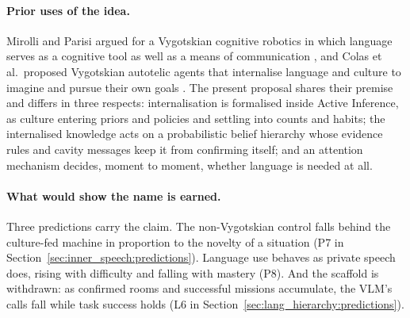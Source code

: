 \paragraph{Prior uses of the idea.}
Mirolli and Parisi argued for a Vygotskian cognitive robotics in which language serves as a cognitive tool as well as
a means of communication \cite{mirolli2011towards}, and Colas et al.\ proposed Vygotskian autotelic agents that
internalise language and culture to imagine and pursue their own goals \cite{colas2022language}. The present proposal
shares their premise and differs in three respects: internalisation is formalised inside Active Inference, as culture
entering priors and policies and settling into counts and habits; the internalised knowledge acts on a probabilistic
belief hierarchy whose evidence rules and cavity messages keep it from confirming itself; and an attention mechanism
decides, moment to moment, whether language is needed at all.

\paragraph{What would show the name is earned.}
Three predictions carry the claim. The non-Vygotskian control falls behind the culture-fed machine in proportion to
the novelty of a situation (P7 in Section~\ref{sec:inner_speech:predictions}). Language use behaves as private speech
does, rising with difficulty and falling with mastery (P8). And the scaffold is withdrawn: as confirmed rooms and
successful missions accumulate, the VLM's calls fall while task success holds (L6 in
Section~\ref{sec:lang_hierarchy:predictions}).
